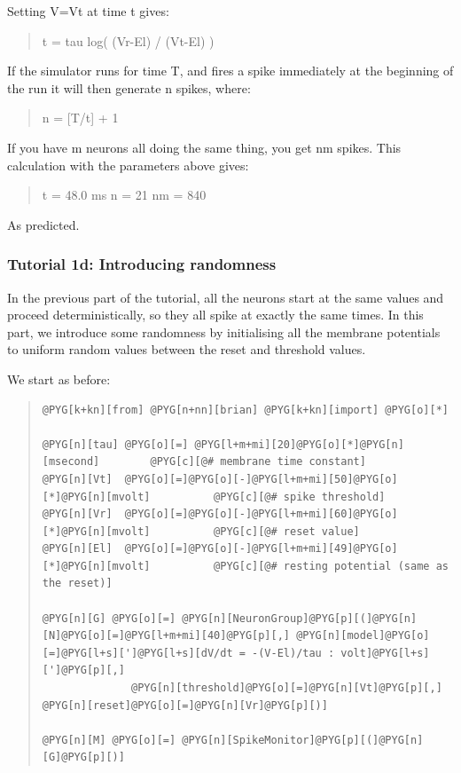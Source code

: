 \documentclass[letterpaper,10pt,english]{manual}
\begin{document}
Setting V=Vt at time t gives:
\begin{quote}

t = tau log( (Vr-El) / (Vt-El) )
\end{quote}

If the simulator runs for time T, and fires a spike immediately
at the beginning of the run it will then generate n spikes,
where:
\begin{quote}

n = {[}T/t{]} + 1
\end{quote}

If you have m neurons all doing the same thing, you get nm
spikes. This calculation with the parameters above gives:
\begin{quote}

t = 48.0 ms
n = 21
nm = 840
\end{quote}

As predicted.

\resetcurrentobjects
\hypertarget{--doc-tutorial_1d_introducing_randomness}{}

\subsubsection{Tutorial 1d: Introducing randomness}

In the previous part of the tutorial, all the neurons start
at the same values and proceed deterministically, so they all
spike at exactly the same times. In this part, we introduce
some randomness by initialising all the membrane potentials
to uniform random values between the reset and threshold
values.

We start as before:
\begin{quote}

\begin{Verbatim}[commandchars=@\[\]]
@PYG[k+kn][from] @PYG[n+nn][brian] @PYG[k+kn][import] @PYG[o][*]

@PYG[n][tau] @PYG[o][=] @PYG[l+m+mi][20]@PYG[o][*]@PYG[n][msecond]        @PYG[c][@# membrane time constant]
@PYG[n][Vt]  @PYG[o][=]@PYG[o][-]@PYG[l+m+mi][50]@PYG[o][*]@PYG[n][mvolt]          @PYG[c][@# spike threshold]
@PYG[n][Vr]  @PYG[o][=]@PYG[o][-]@PYG[l+m+mi][60]@PYG[o][*]@PYG[n][mvolt]          @PYG[c][@# reset value]
@PYG[n][El]  @PYG[o][=]@PYG[o][-]@PYG[l+m+mi][49]@PYG[o][*]@PYG[n][mvolt]          @PYG[c][@# resting potential (same as the reset)]

@PYG[n][G] @PYG[o][=] @PYG[n][NeuronGroup]@PYG[p][(]@PYG[n][N]@PYG[o][=]@PYG[l+m+mi][40]@PYG[p][,] @PYG[n][model]@PYG[o][=]@PYG[l+s][']@PYG[l+s][dV/dt = -(V-El)/tau : volt]@PYG[l+s][']@PYG[p][,]
              @PYG[n][threshold]@PYG[o][=]@PYG[n][Vt]@PYG[p][,] @PYG[n][reset]@PYG[o][=]@PYG[n][Vr]@PYG[p][)]

@PYG[n][M] @PYG[o][=] @PYG[n][SpikeMonitor]@PYG[p][(]@PYG[n][G]@PYG[p][)]
\end{Verbatim}
\end{quote}
\end{document}
